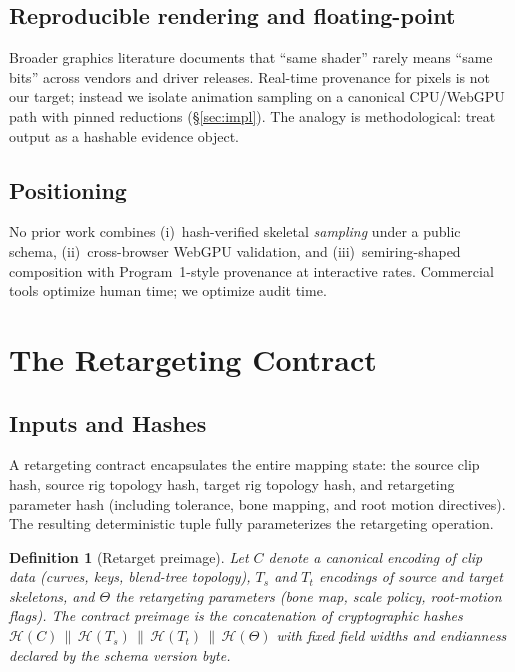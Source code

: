 \documentclass[sigconf,nonacm]{acmart}
\newcommand{\hashfn}{\mathcal{H}}
\newtheorem{definition}{Definition}
\begin{document}
\subsection{Reproducible rendering and floating-point}
Broader graphics literature documents that ``same shader'' rarely means
``same bits'' across vendors and driver releases. Real-time provenance for
pixels is not our target; instead we isolate animation sampling on a canonical
CPU/WebGPU path with pinned reductions (\S\ref{sec:impl}). The analogy is
methodological: treat output as a hashable evidence object.

\subsection{Positioning}
No prior work combines (i)~hash-verified skeletal \emph{sampling} under a
public schema, (ii)~cross-browser WebGPU validation, and (iii)~semiring-shaped
composition with Program~1-style provenance at interactive rates. Commercial
tools optimize human time; we optimize audit time.

\section{The Retargeting Contract}
\label{sec:contract}

\subsection{Inputs and Hashes}
A retargeting contract encapsulates the entire mapping state: the source clip hash, source rig topology hash, target rig topology hash, and retargeting parameter hash (including tolerance, bone mapping, and root motion directives). The resulting deterministic tuple fully parameterizes the retargeting operation. %

\begin{definition}[Retarget preimage]
Let $C$ denote a canonical encoding of clip data (curves, keys, blend-tree
topology), $T_s$ and $T_t$ encodings of source and target skeletons, and
$\Theta$ the retargeting parameters (bone map, scale policy, root-motion
flags). The \emph{contract preimage} is the concatenation of cryptographic
hashes $\hashfn(C) \,\|\, \hashfn(T_s) \,\|\, \hashfn(T_t) \,\|\, \hashfn(\Theta)$
with fixed field widths and endianness declared by the schema version byte.
\end{definition}
\end{document}
